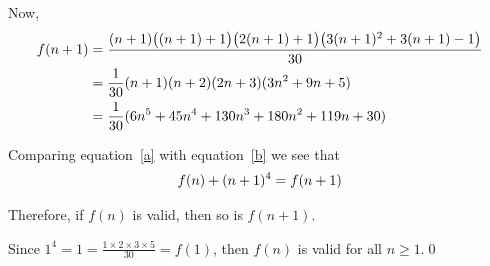 \documentclass[a4paper,12pt]{article}
\begin{document}
\begin{question}
Now,
\begin{align}
	f(n+1)&=\frac{(n+1)\big((n+1)+1\big)\big(2(n+1)+1\big)\big(3(n+1)^2+3(n+1)-1\big)}{30}\notag \\
	&=\frac{1}{30}(n+1)(n+2)(2n+3)(3n^2+9n+5)\notag \\
	&=\frac{1}{30}(6n^5+45n^4+130n^3+180n^2+119n+30)\label{b}
\end{align}

Comparing equation~\eqref{a} with equation~\eqref{b} we see that
\begin{gather}\notag
f(n)+(n+1)^4=f(n+1)
\end{gather}

Therefore, if $f(n)$ is valid, then so is $f(n+1)$.

Since $1^4=1=\frac{1\times2\times3\times5}{30}=f(1)$, then $f(n)$ is valid for all $n\geq1$.\hfill \qed

\end{question}
\end{document}
